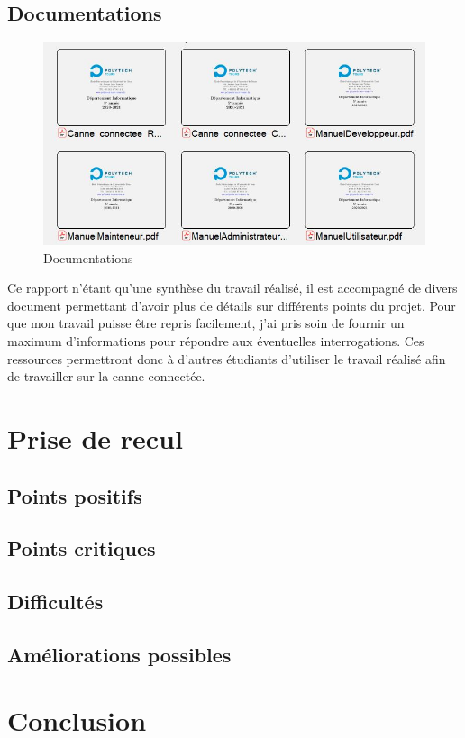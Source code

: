 \documentclass[UTF8]{EPURapport}
\begin{document}
\section{Documentations}

\begin{figure}[h!]
\centering
  \includegraphics[width=\textwidth]{images/docs.JPG}
  \caption{Documentations}
  \label{fig:docs}
\end{figure}

Ce rapport n'étant qu'une synthèse du travail réalisé, il est accompagné de divers document permettant d'avoir plus de détails sur différents points du projet. Pour que mon travail puisse être repris facilement, j'ai pris soin de fournir un maximum d'informations pour répondre aux éventuelles interrogations. Ces ressources permettront donc à d'autres étudiants d'utiliser le travail réalisé afin de travailler sur la canne connectée.

\chapter{Prise de recul}

\section{Points positifs}

\section{Points critiques}

\section{Difficultés}

\section{Améliorations possibles}

\chapter{Conclusion}

\annexes
\end{document}
